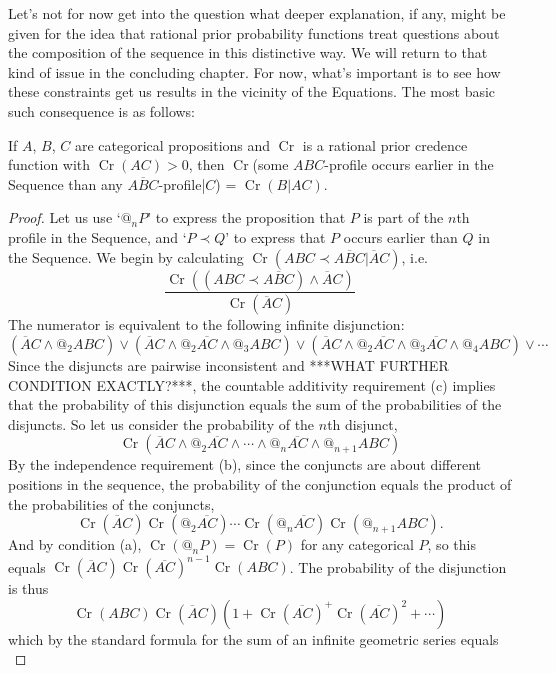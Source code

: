 \documentclass[leqno, 11pt, a5paper, openany]{article}
\newcommand{\negate}[1]{\overline{#1}}
\DeclareMathOperator{\prior}{Cr}
\begin{document}
Let's not for now get into the question what deeper explanation, if any, might be given for the idea that rational prior probability functions treat questions about the composition of the sequence in this distinctive way. We will return to that kind of issue in the concluding chapter. For now, what's important is to see how these constraints get us results in the vicinity of the Equations. The most basic such consequence is as follows:
\begin{prop}
	If $A$, $B$, $C$ are categorical propositions and $\prior$ is a rational prior credence function with $\prior(AC)>0$, then $\prior$(some $ABC$-profile occurs earlier in the Sequence than any $A\negate{B}C$-profile|$C$) = $\prior(B|AC)$. 
\end{prop}
\begin{proof}
	Let us use ‘$@_nP$’ to express the proposition that $P$ is part of the $n$th profile in the Sequence, and ‘$P≺Q$’ to express that $P$ occurs earlier than $Q$ in the Sequence. 
	We begin by calculating $\prior(ABC ≺ A\negate{B}C|\negate{A}C)$, i.e.
	\[
	\frac{\prior((ABC≺A\negate{B}C) ∧ \negate{A}C)}{\prior(\negate{A}C)}
	\]
	The numerator is equivalent to the following infinite disjunction:
	\begin{equation*}
		(\negate{A}C ∧ @_2ABC) ∨ (\negate{A}C ∧ @_2\negate{AC} ∧ @_3ABC) ∨ 
		(\negate{A}C ∧ @_2\negate{AC} ∧  @_3\negate{AC} ∧ @_4ABC) ∨ \cdots
	\end{equation*}
	Since the disjuncts are pairwise inconsistent and ***WHAT FURTHER CONDITION EXACTLY?***, the countable additivity requirement (c) implies that the probability of this disjunction equals the sum of the probabilities of the disjuncts.  So let us consider the probability of the $n$th disjunct,
	\[
	\prior(\negate{A}C∧@_2\negate{AC}∧\cdots∧@_{n}\negate{AC}∧@_{n+1}ABC)
	\]
	By the independence requirement (b), since the conjuncts are about different positions in the sequence, the probability of the conjunction equals the product of the probabilities of the conjuncts, 
	\[
	\prior(\negate{A}C)\prior(@_2\negate{AC})\cdots\prior(@_n\negate{AC})\prior(@_{n+1}ABC).
	\]  
	And by condition (a), $\prior(@_nP) = \prior(P)$ for any categorical $P$, so this equals
	$\prior(\negate{A}C)\prior(\negate{AC})^{n-1}\prior(ABC)$.  The probability of the disjunction is thus
	\[
		\prior(ABC)\prior(\negate{A}C) (1 + \prior(\negate{AC})^ + \prior(\negate{AC})^2 + \cdots)
	\]
	which by the standard formula for the sum of an infinite geometric series equals 
	\begin{equation*}

\end{equation*}
\end{proof}
\end{document}

